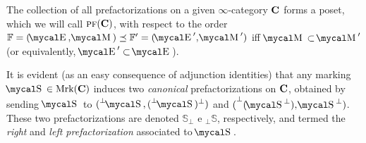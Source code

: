 \begin{remark}\label{def:prefacts}
The collection of all prefactorizations on a given $\infty$\hyp{}category $\textbf{C}$ forms a poset, which we will call $\text{\scshape pf}(\textbf{C})$, with respect to the order $\fF=(\EE,\MM)\preceq \fF'= (\EE',\MM')$ iff $\MM\subset\MM'$ (or equivalently, $\EE'\subset \EE$).
\end{remark}
\begin{remark}
It is evident (as an easy consequence of adjunction identities) that any marking $\mS\in\text{Mrk}(\CC)$ induces two \emph{canonical} prefactorizations on $\textbf{C}$, obtained by sending $\mS$ to $(\prescript{\perp}{}{\mS}, (\prescript{\perp}{}{\mS})^\perp)$ and $(\prescript{\perp}{}{(\mS^\perp)},\mS^\perp)$. These two prefactorizations are denoted $\mathbb S_\perp$ e ${}_\perp\mathbb S$, respectively, and termed the \emph{right} and \emph{left prefactorization} associated to $\mS$.
\end{remark}

